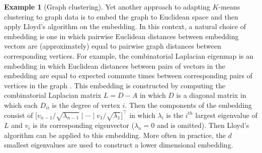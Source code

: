 \documentclass[
  12pt,
]{article}
\theoremstyle{definition}
\theoremstyle{definition}
\newtheorem{example}{Example}[section]
\theoremstyle{definition}
\theoremstyle{definition}
\theoremstyle{remark}
\begin{document}
\begin{example}[Graph clustering]
Yet another approach to adapting $K$-means clustering to graph data is to embed the graph to Euclidean space and then apply Lloyd's algorithm on the embedding. 
In this context, a natural choice of embedding is one in which pairwise Euclidean distances between embedding vectors are (approximately) equal to pairwise graph distances between corresponding vertices. 
For example, the combinatorial Laplacian eigenmap is an embedding in which Euclidean distances between pairs of vectors in the embedding are equal to expected commute times between corresponding pairs of vertices in the graph \citep{vonLuxburg2007}. 
This embedding is constructed by computing the combinatorial Laplacian matrix $L = D - A$ in which $D$ is a diagonal matrix in which each $D_{ii}$ is the degree of vertex $i$. 
Then the components of the embedding consist of $\big[ v_{n-1} / \sqrt{\lambda_{n - 1}} \mid \cdots \mid v_1 / \sqrt{\lambda_1} \big]^\top$ in which $\lambda_i$ is the $i^{th}$ largest eigenvalue of $L$ and $v_i$ is its corresponding eigenvector ($\lambda_n = 0$ and is omitted). 
Then Lloyd's algorithm can be applied to this embedding. 
More often in practice, the $d$ smallest eigenvalues are used to construct a lower dimensional embedding. 
\end{example}
\end{document}
